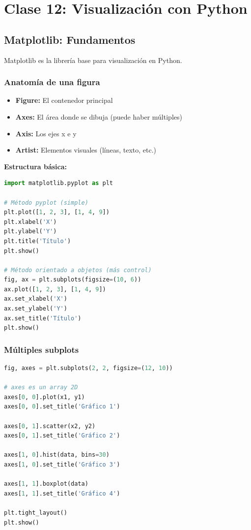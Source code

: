 \documentclass[a4paper,11pt]{article}
\begin{document}
\section{Clase 12: Visualización con Python}

\subsection{Matplotlib: Fundamentos}

Matplotlib es la librería base para visualización en Python.

\subsubsection{Anatomía de una figura}

\begin{itemize}
    \item \textbf{Figure:} El contenedor principal
    \item \textbf{Axes:} El área donde se dibuja (puede haber múltiples)
    \item \textbf{Axis:} Los ejes x e y
    \item \textbf{Artist:} Elementos visuales (líneas, texto, etc.)
\end{itemize}

\textbf{Estructura básica:}
\begin{lstlisting}[language=Python]
import matplotlib.pyplot as plt

# Método pyplot (simple)
plt.plot([1, 2, 3], [1, 4, 9])
plt.xlabel('X')
plt.ylabel('Y')
plt.title('Título')
plt.show()

# Método orientado a objetos (más control)
fig, ax = plt.subplots(figsize=(10, 6))
ax.plot([1, 2, 3], [1, 4, 9])
ax.set_xlabel('X')
ax.set_ylabel('Y')
ax.set_title('Título')
plt.show()
\end{lstlisting}

\subsubsection{Múltiples subplots}

\begin{lstlisting}[language=Python]
fig, axes = plt.subplots(2, 2, figsize=(12, 10))

# axes es un array 2D
axes[0, 0].plot(x1, y1)
axes[0, 0].set_title('Gráfico 1')

axes[0, 1].scatter(x2, y2)
axes[0, 1].set_title('Gráfico 2')

axes[1, 0].hist(data, bins=30)
axes[1, 0].set_title('Gráfico 3')

axes[1, 1].boxplot(data)
axes[1, 1].set_title('Gráfico 4')

plt.tight_layout()
plt.show()
\end{lstlisting}
\end{document}
